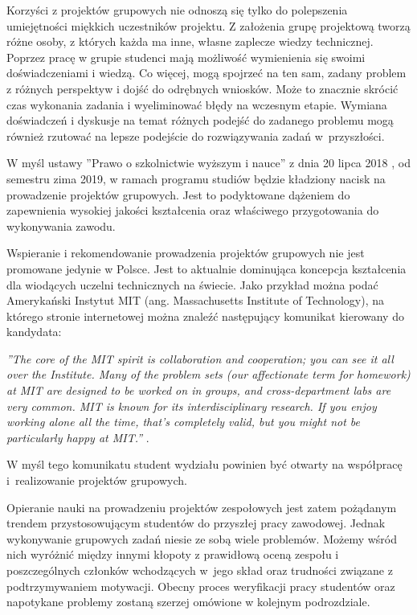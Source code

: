 Korzyści z projektów grupowych nie odnoszą się tylko do polepszenia umiejętności miękkich uczestników projektu.
Z założenia grupę projektową tworzą różne osoby, z których każda ma inne, własne zaplecze wiedzy technicznej.
Poprzez pracę w grupie studenci mają możliwość wymienienia się swoimi doświadczeniami i wiedzą.
Co więcej, mogą spojrzeć na ten sam, zadany problem z różnych perspektyw i dojść do odrębnych wniosków.
Może to znacznie skrócić czas wykonania zadania i wyeliminować błędy na wczesnym etapie. 
Wymiana doświadczeń i dyskusje na temat różnych podejść do zadanego problemu mogą również rzutować na lepsze podejście do rozwiązywania zadań w~przyszłości.

W myśl ustawy ”Prawo o szkolnictwie wyższym i nauce” z dnia 20 lipca 2018 \cite{higher-education-law}, od semestru zima 2019, w ramach programu studiów będzie kładziony nacisk na prowadzenie projektów grupowych.
Jest to podyktowane dążeniem do zapewnienia wysokiej jakości kształcenia oraz właściwego przygotowania do wykonywania zawodu.

Wspieranie i rekomendowanie prowadzenia projektów grupowych nie jest promowane jedynie w Polsce.
Jest to aktualnie dominująca koncepcja kształcenia dla wiodących uczelni technicznych na świecie.
Jako przykład można podać Amerykański Instytut MIT (ang. Massachusetts Institute of Technology), na którego stronie internetowej można znaleźć następujący komunikat kierowany do kandydata:

\textit{”The core of the MIT spirit is collaboration and cooperation; you can see it all over the Institute.
Many of the problem sets (our affectionate term for homework) at MIT are designed to be worked on in groups, and cross-department labs are very common.
MIT is known for its interdisciplinary research.
If you enjoy working alone all the time, that’s completely valid, but you might not be particularly happy at MIT.”} \cite{mit-groups}.

W myśl tego komunikatu student wydziału powinien być otwarty na współpracę i~realizowanie projektów grupowych.

Opieranie nauki na prowadzeniu projektów zespołowych jest zatem pożądanym trendem przystosowującym studentów do przyszłej pracy zawodowej.
Jednak wykonywanie grupowych zadań niesie ze sobą wiele problemów.
Możemy wśród nich wyróżnić między innymi kłopoty z prawidłową oceną zespołu i poszczególnych członków wchodzących w~jego skład  oraz trudności związane z podtrzymywaniem motywacji.
Obecny proces weryfikacji pracy studentów oraz napotykane problemy zostaną szerzej omówione w kolejnym podrozdziale.

